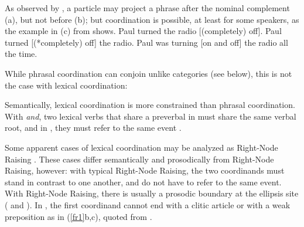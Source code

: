 \eal
{}
\zl

As observed by \citet[--177]{hpsg1}, a particle may project a phrase after the nominal
complement (a), but not before (b); but coordination is possible, at least for some
speakers, as the example in (c) from  shows.
\eal
\ex Paul turned the radio [(completely) off].
\ex Paul turned [(*completely) off] the radio.
\ex Paul was turning [on and off] the radio all the time.
\zl

While phrasal coordination can conjoin unlike categories (see below), this is not the case with lexical coordination:

\eal
{}
\zl

Semantically, lexical coordination is more constrained than phrasal coordination. With \textit{and},
two lexical verbs that share a preverbal  in  must share the same verbal root, and in
, they must refer to the same event \citep{Bosque:86}.

\eal
{}
\zl

\noindent%
Some apparent cases of lexical coordination may be analyzed as Right-Node Raising
\citep{Beavers}. These cases differ semantically and prosodically from Right-Node Raising, however: with typical Right-Node
Raising, the two coordinands must stand in contrast to one another, and do not have to refer to the
same event. With Right-Node Raising, there is usually a prosodic boundary at the ellipsis site (%
\citealt[843--844]{chavesrnr} and ). In , the first coordinand cannot end with a clitic article or with a weak preposition as in (\ref{fr1}b,c), quoted from \citep[]{Abeille:06}.

